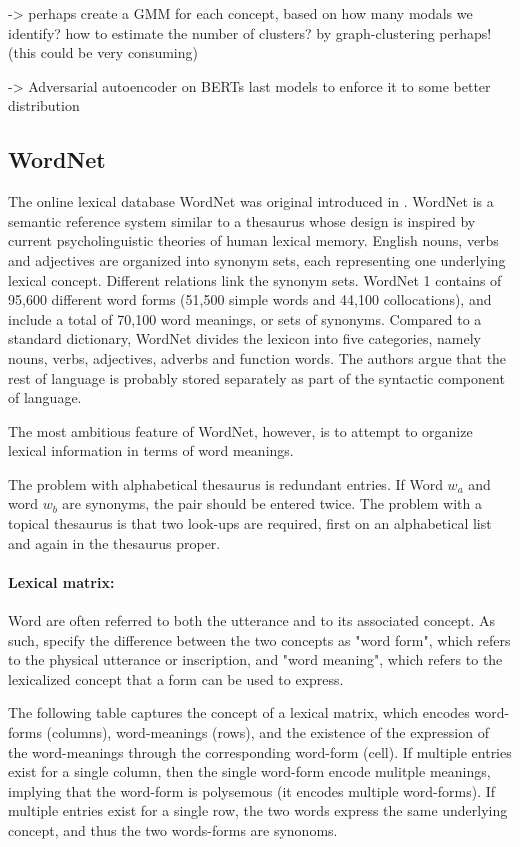 \documentclass[a4paper,12pt,twoside,openright]{report}
\begin{document}
-> perhaps create a GMM for each concept, based on how many modals we identify? how to estimate the number of clusters? by graph-clustering perhaps! (this could be very consuming)

-> Adversarial autoencoder on BERTs last models to enforce it to some better distribution

\subsection{WordNet}

The online lexical database WordNet was original introduced in \cite{miller90}.
WordNet is a semantic reference system similar to a thesaurus whose design is inspired by current psycholinguistic theories of human lexical memory.
English nouns, verbs and adjectives are organized into synonym sets, each representing one underlying lexical concept.
Different relations link the synonym sets.
WordNet 1 contains of 95,600 different word forms (51,500 simple words and 44,100 collocations), and include a total of 70,100 word meanings, or sets of synonyms.
Compared to a standard dictionary, WordNet divides the lexicon into five categories, namely nouns, verbs, adjectives, adverbs and function words. 
The authors argue that the rest of language is probably stored separately as part of the syntactic component of language.

The most ambitious feature of WordNet, however, is to attempt to organize lexical information in terms of word meanings.

The problem with alphabetical thesaurus is redundant entries. If Word $w_a$ and word $w_b$ are synonyms, the pair should be entered twice.
The problem with a topical thesaurus is that two look-ups are required, first on an alphabetical list and again in the thesaurus proper.

\paragraph{Lexical matrix:} 
Word are often referred to both the utterance and to its associated concept.
As such, \cite{miller90} specify the difference between the two concepts as "word form", which refers to the physical utterance or inscription, and "word meaning", which refers to the lexicalized concept that a form can be used to express.

The following table captures the concept of a lexical matrix, which encodes word-forms (columns), word-meanings (rows), and the existence of the expression of the word-meanings through the corresponding word-form (cell).
If multiple entries exist for a single column, then the single word-form encode mulitple meanings, implying that the word-form is polysemous (it encodes multiple word-forms).
If multiple entries exist for a single row, the two words express the same underlying concept, and thus the two words-forms are synonoms.
\end{document}
